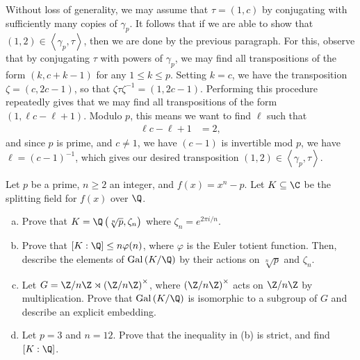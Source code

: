 \documentclass[10pt]{mypackage}
\begin{document}
\begin{solution}
\begin{enumerate}[(a)]
      Without loss of generality, we may assume that $\tau = \left( 1,c \right)$ by conjugating with sufficiently many copies of $\gamma_p$. It follows that if we are able to show that $\left( 1,2 \right)\in \left\langle \gamma_p,\tau \right\rangle$, then we are done by the previous paragraph. For this, observe that by conjugating $\tau$ with powers of $\gamma_p$, we may find all transpositions of the form $\left( k,c + k-1 \right)$ for any $1\leq k \leq p$. Setting $k = c$, we have the transposition $\zeta = \left( c,2c-1 \right)$, so that $\zeta\tau\zeta^{-1} = \left( 1,2c-1 \right)$. Performing this procedure repeatedly gives that we may find all transpositions of the form $\left( 1,\ell c - \ell + 1 \right)$. Modulo $p$, this means we want to find $\ell$ such that
      \begin{align*}
        \ell c - \ell + 1 &= 2,
      \end{align*}
      and since $p$ is prime, and $c\neq 1$, we have $\left( c-1 \right)$ is invertible mod $p$, we have $\ell = \left( c-1 \right)^{-1}$, which gives our desired transposition $\left( 1,2 \right)\in \left\langle \gamma_p,\tau \right\rangle$.
  \end{enumerate}
\end{solution}
\begin{problem}[Problem 5]
  Let $p$ be a prime, $n\geq 2$ an integer, and $f(x) = x^{n} - p$. Let $K\subseteq \C$ be the splitting field for $f(x)$ over $\Q$.
  \begin{enumerate}[(a)]
    \item Prove that $K = \Q\left( \sqrt[n]{p},\zeta_n \right)$ where $\zeta_n = e^{2\pi i /n}$.
    \item Prove that $\left[ K:\Q \right]\leq n\varphi(n)$, where $\varphi$ is the Euler totient function. Then, describe the elements of $\operatorname{Gal}\left( K/\Q \right)$ by their actions on $\sqrt[n]{p}$ and $\zeta_n$.
    \item Let $G = \Z/n\Z\rtimes \left( \Z/n\Z \right)^{\times}$, where $\left( \Z/n\Z \right)^{\times}$ acts on $\Z/n\Z$ by multiplication. Prove that $\operatorname{Gal}\left( K/\Q \right)$ is isomorphic to a subgroup of $G$ and describe an explicit embedding.
    \item Let $p = 3$ and $n = 12$. Prove that the inequality in (b) is strict, and find $\left[ K:\Q \right]$.
  \end{enumerate}
\end{problem}
\end{document}
